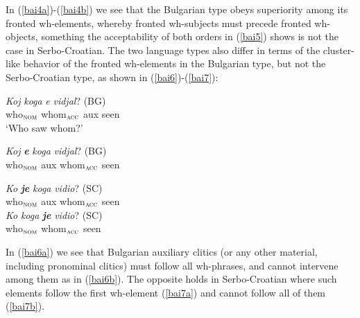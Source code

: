 \documentclass[output=paper,colorlinks,citecolor=brown,
]{langscibook}
\begin{document}
In (\ref{bai4a})-(\ref{bai4b}) we see that the Bulgarian type obeys superiority among its fronted wh-elements, whereby fronted wh-subjects must precede fronted wh-objects, something the acceptability of both orders in (\ref{bai5}) shows is not the case in Serbo-Croatian. The two language types also differ in terms of the cluster-like behavior of the fronted wh-elements in the Bulgarian type, but not the Serbo-Croatian type, as shown in (\ref{bai6})-(\ref{bai7}):

\begin{exe}
\ex \label{bai6}
\begin{xlist}
\ex \label{bai6a}
\gll \emph{Koj}		\emph{koga}	\emph{e}	\emph{vidjal}? \hspace{5.5cm}(BG) \\
who$_{\textsc{nom}}$ whom$_{\textsc{acc}}$ aux seen\\
\glt `Who saw whom?'

\ex \label{bai6b}
\gll *\emph{Koj}	\textbf{\emph{e}}	\emph{koga}		\emph{vidjal}? \hspace{5.5cm}(BG) \\
who$_{\textsc{nom}}$ aux whom$_{\textsc{acc}}$ seen\\
\end{xlist}
\end{exe}

\begin{exe}
\ex \label{bai7}
\begin{xlist}
\ex \label{bai7a}
\gll \emph{Ko}	\emph{\textbf{je}} \emph{koga}		\emph{vidio}? \jambox{}(SC) \\
who$_{\textsc{nom}}$ aux whom$_{\textsc{acc}}$ seen\\

\ex \label{bai7b}
\gll *\emph{Ko}		\emph{koga}	 \emph{\textbf{je}}	\emph{vidio}? \jambox{}(SC) \\
who$_{\textsc{nom}}$ whom$_{\textsc{acc}}$ seen\\
\end{xlist}
\end{exe}

In (\ref{bai6a}) we see that Bulgarian auxiliary clitics (or any other material, including pronominal clitics) must follow all wh-phrases, and cannot intervene among them as in (\ref{bai6b}). The opposite holds in Serbo-Croatian where such elements follow the first wh-element (\ref{bai7a}) and cannot follow all of them (\ref{bai7b}). 
\end{document}
